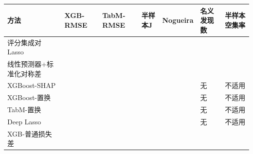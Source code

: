 \documentclass[UTF8,11pt,a4paper]{ctexart}
\begin{document}
{\def\LTcaptype{none} %
{
\footnotesize
\begin{longtable}[]{@{}
  >{\raggedright\arraybackslash}p{}
  >{\raggedright\arraybackslash}p{}
  >{\raggedright\arraybackslash}p{}
  >{\raggedright\arraybackslash}p{}
  >{\raggedright\arraybackslash}p{}
  >{\raggedright\arraybackslash}p{}
  >{\raggedright\arraybackslash}p{}@{}}
\toprule\noalign{}
\begin{minipage}[b]{\linewidth}\raggedright
方法
\end{minipage} & \begin{minipage}[b]{\linewidth}\raggedright
XGB-RMSE
\end{minipage} & \begin{minipage}[b]{\linewidth}\raggedright
TabM-RMSE
\end{minipage} & \begin{minipage}[b]{\linewidth}\raggedright
半样本J
\end{minipage} & \begin{minipage}[b]{\linewidth}\raggedright
Nogueira
\end{minipage} & \begin{minipage}[b]{\linewidth}\raggedright
名义发现数
\end{minipage} & \begin{minipage}[b]{\linewidth}\raggedright
半样本空集率
\end{minipage} \\
\midrule\noalign{}
\endhead
\bottomrule\noalign{}
\endlastfoot
评分集成对Lasso & 1.8941 & 1.8790 & 0.5216 & 0.3650 & 0 & 0.317 \\
线性预测器+标准化对称差 & 1.8825 & 1.8849 & 0.6017 & 0.4680 & 10 & 0.367 \\
XGBoost-SHAP & 1.8466 & 1.8571 & 0.7682 & 0.7439 & 无 & 不适用 \\
XGBoost-置换 & 1.8478 & 1.8612 & 0.7853 & 0.7666 & 无 & 不适用 \\
TabM-置换 & 1.8458 & 1.8586 & 0.7288 & 0.6841 & 无 & 不适用 \\
Deep Lasso & 1.8468 & 1.8567 & 0.8394 & 0.8012 & 无 & 不适用 \\
XGB-普通损失差 & 1.8484 & 1.8577 & 0.5515 & 0.4225 & 6 & 0.067 \\

\end{longtable}}}
\end{document}
